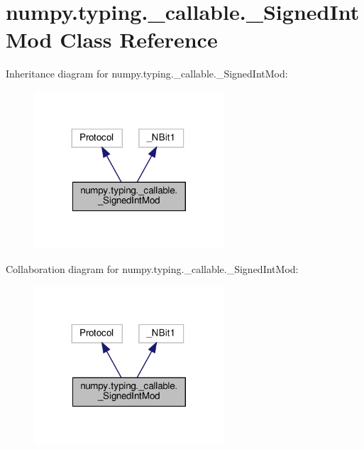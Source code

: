 \hypertarget{classnumpy_1_1typing_1_1__callable_1_1__SignedIntMod}{}\section{numpy.\+typing.\+\_\+callable.\+\_\+\+Signed\+Int\+Mod Class Reference}
\label{classnumpy_1_1typing_1_1__callable_1_1__SignedIntMod}


Inheritance diagram for numpy.\+typing.\+\_\+callable.\+\_\+\+Signed\+Int\+Mod\+:
\nopagebreak
\begin{figure}[H]
\begin{center}
\leavevmode
\includegraphics[width=200pt]{classnumpy_1_1typing_1_1__callable_1_1__SignedIntMod__inherit__graph}
\end{center}
\end{figure}


Collaboration diagram for numpy.\+typing.\+\_\+callable.\+\_\+\+Signed\+Int\+Mod\+:
\nopagebreak
\begin{figure}[H]
\begin{center}
\leavevmode
\includegraphics[width=200pt]{classnumpy_1_1typing_1_1__callable_1_1__SignedIntMod__coll__graph}
\end{center}
\end{figure}
